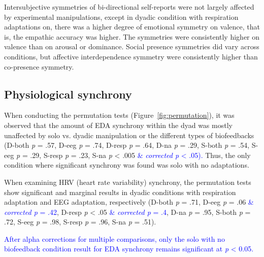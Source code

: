 \documentclass[manuscript, review = false, screen]{acmart}
\begin{document}
Intersubjective symmetries of bi-directional self-reports were not largely affected by experimental manipulations, except in dyadic condition with respiration adaptations on, there was a higher degree of emotional symmetry on valence, that is, the empathic accuracy was higher. The symmetries were consistently higher on valence than on arousal or dominance. Social presence symmetries did vary across conditions, but affective interdependence symmetry were consistently higher than co-presence symmetry. 





\subsection{Physiological synchrony}
When conducting the permutation tests (Figure~\ref{fig:permutation}), it was observed that the amount of EDA synchrony within the dyad was mostly unaffected by solo vs. dyadic manipulation or the different types of biofeedbacks (D-both \textit{p} = .57, D-eeg \textit{p} = .74, D-resp \textit{p} = .64, D-na \textit{p} = .29, S-both \textit{p} = .54, S-eeg \textit{p} = .29, S-resp \textit{p} = .23, S-na \textit{p} < .005 \textcolor{blue}{ \& \textit{corrected p} < .05).} Thus, the only condition where significant synchrony was found was solo with no adaptations.

When examining HRV (heart rate variability) synchrony, the permutation tests show significant and marginal results in dyadic conditions with respiration adaptation and EEG adaptation, respectively (D-both \textit{p} = .71, D-eeg \textit{p} = .06 \textcolor{blue}{\& \textit{corrected p} = .42}, D-resp \textit{p} < .05 \textcolor{blue}{\& \textit{corrected p} = .4}, D-na \textit{p} = .95, S-both \textit{p} = .72, S-eeg \textit{p} = .98, S-resp \textit{p} = .96, S-na \textit{p} = .51).

\textcolor{blue}{After alpha corrections for multiple comparisons, only the solo with no biofeedback condition result for EDA synchrony remains significant at \textit{p} < 0.05.}
\end{document}
